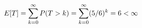 \documentclass[preview]{standalone}
\begin{document}
\begin{align*}
\special{dvisvgm:raw <g id='unique000'>}E[T]=\sum_{k=0}^\infty P(T>k)=\sum_{k=0}^\infty(5/6)^k=6<\infty\special{dvisvgm:raw </g>}
\end{align*}
\end{document}
